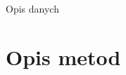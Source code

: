 \documentclass{beamer}
\begin{document}

\begin{frame}{Opis danych}



\end{frame}





\section{Opis metod}
\end{document}
